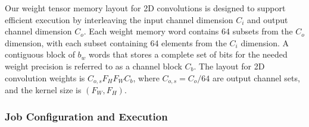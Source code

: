 \documentclass[sigconf]{acmart}
\newcommand{\MVU}{MVU}
\newcommand{\pito}{Pito}
\newcommand{\sean}[1]{{\color{blue} #1}}
\begin{document}
Our weight tensor memory layout for 2D convolutions is designed to support efficient execution by interleaving the input channel dimension $C_i$ and output channel dimension $C_o$. Each weight memory word contains 64 subsets from the $C_o$ dimension, with each subset containing 64 elements from the $C_i$ dimension. A contiguous block of $b_w$ words that stores a complete set of bits for the needed weight precision is referred to as a channel block $C_b$. The layout for 2D convolution weights is $C_{o,s}F_HF_WC_b$, where $C_{o,s} = C_o/64$ are output channel sets, and the kernel size is $(F_W,F_H)$. 

 


\subsubsection{Job Configuration and Execution}
\end{document}
